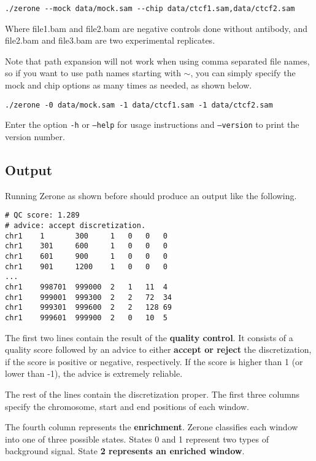 \documentclass[12pt]{article}
\begin{document}
\begin{verbatim}
./zerone --mock data/mock.sam --chip data/ctcf1.sam,data/ctcf2.sam
\end{verbatim}

Where file1.bam and file2.bam are negative controls done without antibody,
and file2.bam and file3.bam are two experimental replicates.

Note that path expansion will not work when using comma separated file names,
so if you want to use path names starting with $\sim$, you can simply
specify the mock and chip options as many times as needed, as shown below.

\begin{verbatim}
./zerone -0 data/mock.sam -1 data/ctcf1.sam -1 data/ctcf2.sam
\end{verbatim}

Enter the option \texttt{-h} or \texttt{--help} for usage instructions and
\texttt{--version} to print the version number.

\subsection{Output}

Running Zerone as shown before should produce an output like the following.

\begin{verbatim}
# QC score: 1.289
# advice: accept discretization.
chr1    1       300     1   0   0   0
chr1    301     600     1   0   0   0
chr1    601     900     1   0   0   0
chr1    901     1200    1   0   0   0
...
chr1    998701  999000  2   1   11  4
chr1    999001  999300  2   2   72  34
chr1    999301  999600  2   2   128 69
chr1    999601  999900  2   0   10  5
\end{verbatim}

\begin{mdframed}
The first two lines contain the result of the \textbf{quality control}.
It consists of a quality score followed by an advice to either
\textbf{accept or reject} the discretization, if the score is positive or
negative, respectively. If the score is higher than 1 (or lower than -1), the
advice is extremely reliable.
\end{mdframed}

The rest of the lines contain the discretization proper. The first three columns
specify the chromosome, start and end positions of each window.

\begin{mdframed}
The fourth column represents the \textbf{enrichment}. Zerone classifies
each window into one of three possible states. States 0 and 1 represent two
types of background signal. State \textbf{2 represents an enriched window}.
\end{mdframed}
\end{document}
